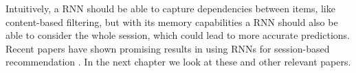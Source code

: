 Intuitively, a RNN should be able to capture dependencies between items, like content-based filtering, but with its memory capabilities a RNN should also be able to consider the whole session, which could lead to more accurate predictions. Recent papers have shown promising results in using RNNs for session-based recommendation \cite{DBLP:journals/corr/HidasiKBT15} \cite{DBLP:journals/corr/TanXL16} \cite{ZALANDO:understanding-consumer-histories}. In the next chapter we look at these and other relevant papers.

